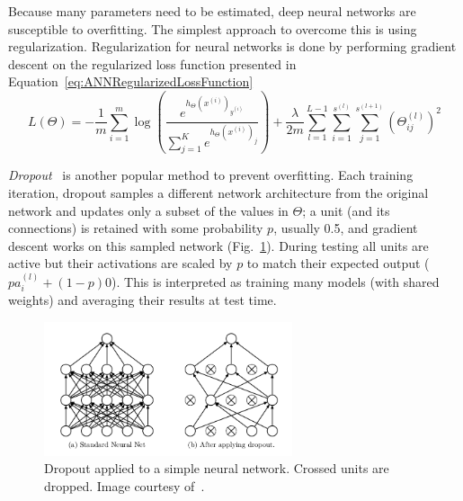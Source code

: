 Because many parameters need to be estimated, deep neural networks are susceptible to overfitting. The simplest approach to overcome this is using regularization. Regularization for neural networks is done by performing gradient descent on the regularized loss function presented in Equation~\ref{eq:ANNRegularizedLossFunction}
\begin{equation}
	L(\Theta) = -\frac{1}{m} \sum_{i=1}^m \log \left ( \frac{ e^{h_\Theta(x^{(i)})_{y^{(i)}}} }{ \sum_{j=1}^K e^{ h_\Theta (x^{(i)})_j} } \right ) + \frac{\lambda}{2m}\sum_{l=1}^{L-1}\sum_{i=1}^{s^{(l)}}\sum_{j=1}^{s^{(l+1)}} \left(\Theta^{(l)}_{ij}\right)^2
	\label{eq:ANNRegularizedLossFunction}
\end{equation}

\emph{Dropout}~\cite{Srivastava2014} is another popular method to prevent overfitting. Each training iteration, dropout samples a different network architecture from the original network and updates only a subset of the values in $\Theta$; a unit (and its connections) is retained with some probability $p$, usually 0.5, and gradient descent works on this sampled network (Fig.~\ref{fig:Dropout}). During testing all units are active but their activations are scaled by $p$ to match their expected output ($p a^{(l)}_i + (1-p) 0$). This is interpreted as training many models (with shared weights) and averaging their results at test time.

\begin{figure}[h]
	\centering
	\includegraphics[width = 0.65\textwidth]{plots/dropout.png}
	\caption[Example of Dropout]{Dropout applied to a simple neural network. Crossed units are dropped. Image courtesy of~\cite{Srivastava2014}.}
	\label{fig:Dropout}
\end{figure}
